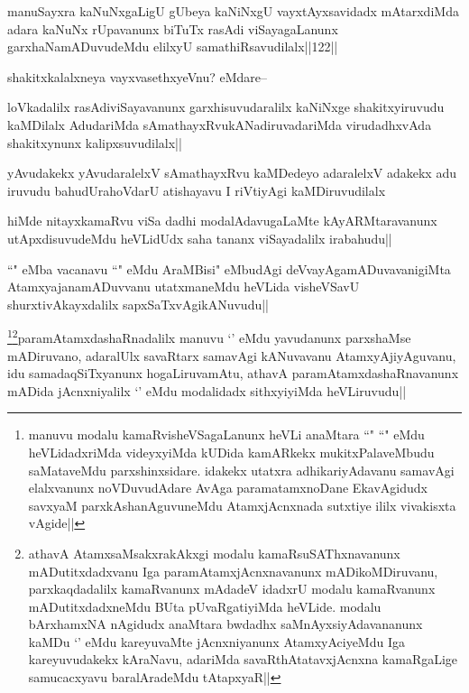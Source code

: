\begin{artha}
manuSayxra kaNuNxgaLigU gUbeya kaNiNxgU vayxtAyxsavidadx mAtarxdiMda adara kaNuNx rUpavanunx biTuTx rasAdi viSayagaLanunx garxhaNamADuvudeMdu elilxyU samathiRsavudilalx||122||
\end{artha}

\begin{artha}
shakitxkalalxneya vayxvasethxyeVnu? eMdare--
\end{artha}

\begin{artha}
loVkadalilx rasAdiviSayavanunx garxhisuvudaralilx kaNiNxge shakitxyiruvudu kaMDilalx AdudariMda sAmathayxRvukANadiruvadariMda virudadhxvAda shakitxynunx kalipxsuvudilalx||
\end{artha}

\begin{artha}
yAvudakekx yAvudaralelxV sAmathayxRvu kaMDedeyo adaralelxV adakekx adu iruvudu bahudUrahoVdarU atishayavu I riVtiyAgi kaMDiruvudilalx
\end{artha}

\begin{artha}
hiMde nitayxkamaRvu viSa dadhi modalAdavugaLaMte kAyARMtaravanunx utApxdisuvudeMdu heVLidUdx saha tananx viSayadalilx irabahudu||
\end{artha}

\begin{artha}
``\stext" eMba vacanavu ``\stext" eMdu AraMBisi" eMbudAgi  deVvayAgamADuvavanigiMta AtamxyajanamADuvvanu utatxmaneMdu heVLida visheVSavU shurxtivAkayxdalilx sapxSaTxvAgikANuvudu||
\end{artha}

\begin{artha}
\footnote{manuvu modalu kamaRvisheVSagaLanunx heVLi anaMtara ``\stext" ``\stext" eMdu heVLidadxriMda videyxyiMda kUDida kamARkekx mukitxPalaveMbudu saMataveMdu parxshinxsidare. idakekx utatxra adhikariyAdavanu samavAgi elalxvanunx noVDuvudAdare AvAga paramatamxnoDane EkavAgidudx savxyaM parxkAshanAguvuneMdu AtamxjAcnxnada sutxtiye ililx vivakisxta vAgide||}\footnote{athavA AtamxsaMsakxrakAkxgi modalu kamaRsuSAThxnavanunx mADutitxdadxvanu Iga paramAtamxjAcnxnavanunx  mADikoMDiruvanu, parxkaqdadalilx kamaRvanunx mAdadeV idadxrU modalu kamaRvanunx mADutitxdadxneMdu BUta pUvaRgatiyiMda heVLide. modalu bArxhamxNA nAgidudx anaMtara bwdadhx saMnAyxsiyAdavananunx kaMDu `\stext' eMdu kareyuvaMte jAcnxniyanunx AtamxyAciyeMdu Iga kareyuvudakekx kAraNavu, adariMda savaRthAtatavxjAcnxna kamaRgaLige samucacxyavu baralAradeMdu tAtapxyaR||}paramAtamxdashaRnadalilx manuvu `\stext' eMdu yavudanunx parxshaMse mADiruvano, adaralUlx savaRtarx samavAgi kANuvavanu AtamxyAjiyAguvanu, idu samadaqSiTxyanunx hogaLiruvamAtu, athavA paramAtamxdashaRnavanunx mADida jAcnxniyalilx `\stext' eMdu modalidadx sithxyiyiMda heVLiruvudu||
\end{artha}


